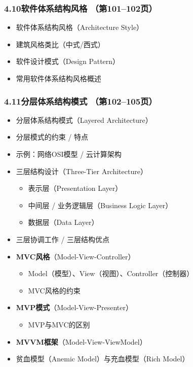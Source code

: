 \documentclass[12pt,a4paper]{ctexart}
\begin{document}
\subsubsection{4.10\quad 软件体系结构风格 \hfill（第101--102页）}
\begin{itemize}
    \item 软件体系结构风格（Architecture Style）
    \item 建筑风格类比（中式/西式）
    \item 软件设计模式（Design Pattern）
    \item 常用软件体系结构风格概述
\end{itemize}

\subsubsection{4.11\quad 分层体系结构模式 \hfill（第102--105页）}
\begin{itemize}
    \item 分层体系结构模式（Layered Architecture）
    \item 分层模式的约束 / 特点
    \item 示例：网络OSI模型 / 云计算架构
    \item 三层结构设计（Three-Tier Architecture）
    \begin{itemize}
        \item 表示层（Presentation Layer）
        \item 中间层 / 业务逻辑层（Business Logic Layer）
        \item 数据层（Data Layer）
    \end{itemize}
    \item 三层协调工作 / 三层结构优点
    \item \textbf{MVC风格}（Model-View-Controller）
    \begin{itemize}
        \item Model（模型）、View（视图）、Controller（控制器）
        \item MVC风格的约束
    \end{itemize}
    \item \textbf{MVP模式}（Model-View-Presenter）
    \begin{itemize}
        \item MVP与MVC的区别
    \end{itemize}
    \item \textbf{MVVM框架}（Model-View-ViewModel）
    \item 贫血模型（Anemic Model）与充血模型（Rich Model）
\end{itemize}
\end{document}
